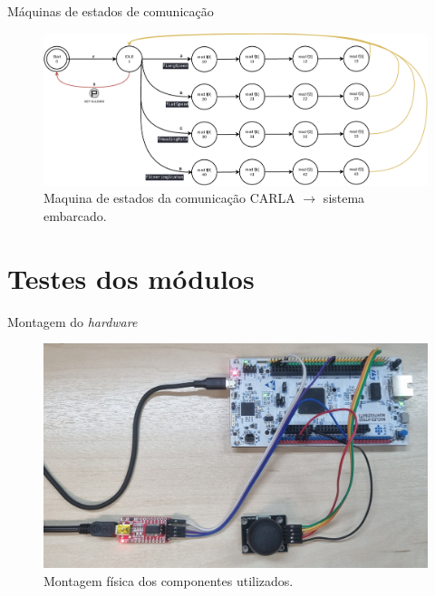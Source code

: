 \documentclass{if-beamer}
\begin{document}
\begin{frame}{Máquinas de estados de comunicação}
	
	\begin{figure}[H]
		\centering
		\includegraphics[width=\linewidth]{sm_carla_2_uc}
		\caption{Maquina de estados da comunicação CARLA $\longrightarrow$ sistema embarcado.}
		\label{fig:sm_carla_2_uc}
	\end{figure}

\end{frame}


\section{Testes dos módulos}

\begin{frame}{Montagem do \textit{hardware}}
	
	\begin{figure}[H]
		\centering
		\includegraphics[width=0.8\linewidth]{montagem}
		\caption{Montagem física dos componentes utilizados.}
		\label{fig:somevideo}
	\end{figure}
	
	
	
\end{frame}
\end{document}
